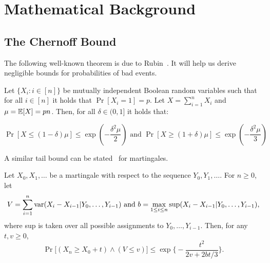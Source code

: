\section{Mathematical Background}
\subsection{The Chernoff Bound}

The following well-known theorem is due to
Rubin~\cite{chernoff1952measure,chernoff2014career}. It will help us derive
negligible bounds for probabilities of bad events.

\begin{theorem}
  Let $\{X_i: i \in [n]\}$ be mutually independent Boolean random variables
  such that for all $i \in [n]$ it holds that $\Pr[X_i = 1] = p$. Let
  $X = \sum_{i = 1}^n X_i$ and $\mu = \operatorname{\mathbb{E}}[X] = pn$. Then, for all
  $\delta \in (0, 1]$ it holds that:

  \[
    \Pr[X \leq (1 - \delta)\mu] \leq \exp(-\frac{\delta^2\mu}{2})
    \text{ and }
    \Pr[X \geq (1 + \delta)\mu] \leq \exp(-\frac{\delta^2\mu}{3})
  \]
\end{theorem}

A similar tail bound can be stated~\cite[Theorem~3.15]{mcdiarmid1998} for martingales.

\begin{theorem}
\label{theorem:tailbound}
	Let $X_0,X_1,\dots$ be a martingale with respect to the sequence
	$Y_0,Y_1,\dots$.
	For $n\ge0$, let
	\[
		V=\sum_{i=1}^n\mathrm{var}(X_i-X_{i-1}|Y_0,\dots,Y_{i-1})
		\hbox{~and~}
		b=\max_{1\le i\le n}\sup(X_i-X_{i-1}|Y_0,\dots,Y_{i-1})
	,\]
	where sup is taken over all possible assignments to $Y_0,\dots,Y_{i-1}$.
	Then, for any $t,v\ge0$,
	\[\Pr\bigl[(X_n\ge X_0+t)\wedge(V\le v)\bigr]\le\exp\biggl\{-\frac{t^2}{2v+2bt/3}\biggr\}.\]
\end{theorem}
